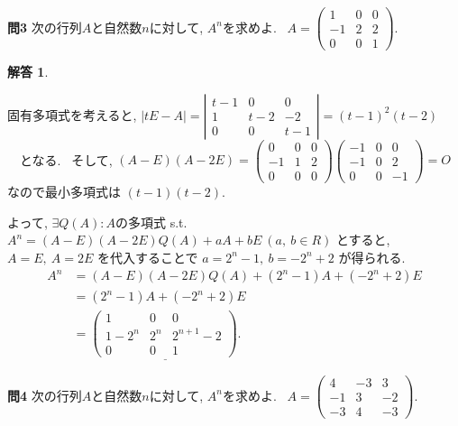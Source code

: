 \documentclass{jsarticle}
\newtheorem*{answer*}{解答}
\begin{document}
\begin{itembox}[l]{\textbf{問3}}
次の行列$A$と自然数$n$に対して, $A^n$を求めよ. \ 
$A=\left(\begin{array}{ccc}
1 & 0 & 0 \\
-1 & 2 & 2 \\
0 & 0 & 1
\end{array}\right)$.
\end{itembox}

\begin{answer*}
\end{answer*}
固有多項式を考えると, $|t E-A|=\left|\begin{array}{ccc}
t-1 & 0 & 0 \\
1 & t-2 & -2 \\
0 & 0 & t-1
\end{array}\right| 
= (t-1)^2 (t-2)$ \ \ となる. \ そして, $(A-E)(A-2E) = \begin{pmatrix} 0 & 0 & 0 \\ -1 & 1 & 2 \\ 0 & 0 & 0 \end{pmatrix}
\begin{pmatrix} -1 & 0 & 0 \\ -1 & 0 & 2 \\ 0 & 0 & -1 \end{pmatrix} = O$ なので最小多項式は $(t-1)(t-2)$.

よって, $\exists Q(A):Aの多項式$ s.t. $A^n = (A-E)(A-2E)Q(A) + aA + bE \ (a, \ b \in R)$ とすると, $A=E, \ A=2E$ を代入することで $a = 2^n-1, \ b = -2^n+2$ が得られる.
\begin{align*}
A^n &= (A-E)(A-2E)Q(A) + (2^n-1)A +(-2^n+2)E \\
&= (2^n-1)A +(-2^n+2)E \\
&= \underline{\begin{pmatrix} 1 & 0 & 0 \\ 1-2^n & 2^n & 2^{n+1}-2 \\ 0 & 0 & 1 \end{pmatrix}.}
\end{align*}

\bigskip

\begin{itembox}[l]{\textbf{問4}}
次の行列$A$と自然数$n$に対して, $A^n$を求めよ. \ 
$A=\left(\begin{array}{ccc}
4 & -3 & 3 \\
-1 & 3 & -2 \\
-3 & 4 & -3
\end{array}\right)$.
\end{itembox}
\end{document}
